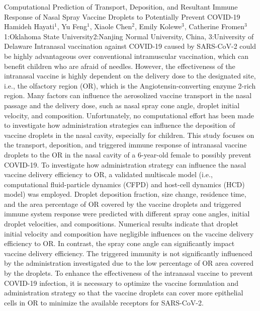 \begin{addmargin}[2em]{0em}
\vspace{1.5ex}
\abs
{Computational Prediction of Transport, Deposition, and Resultant Immune Response of Nasal Spray Vaccine Droplets to Potentially Prevent COVID-19}
{Hamideh Hayati$^1$, Yu Feng$^1$, Xiaole Chen$^2$, Emily Kolewe$^3$, Catherine Fromen$^3$}
{1:Oklahoma State University2:Nanjing Normal University, China, 3:University of Delaware}
{Intranasal vaccination against COVID-19 caused by SARS-CoV-2 could be highly advantageous over conventional intramuscular vaccination, which can benefit children who are afraid of needles. However, the effectiveness of the intranasal vaccine is highly dependent on the delivery dose to the designated site, i.e., the olfactory region (OR), which is the Angiotensin-converting enzyme 2-rich region. Many factors can influence the aerosolized vaccine transport in the nasal passage and the delivery dose, such as nasal spray cone angle, droplet initial velocity, and composition. Unfortunately, no computational effort has been made to investigate how administration strategies can influence the deposition of vaccine droplets in the nasal cavity, especially for children. This study focuses on the transport, deposition, and triggered immune response of intranasal vaccine droplets to the OR in the nasal cavity of a 6-year-old female to possibly prevent COVID-19. To investigate how administration strategy can influence the nasal vaccine delivery efficiency to OR, a validated multiscale model (i.e., computational fluid-particle dynamics (CFPD) and host-cell dynamics (HCD) model) was employed. Droplet deposition fraction, size change, residence time, and the area percentage of OR covered by the vaccine droplets and triggered immune system response were predicted with different spray cone angles, initial droplet velocities, and compositions. Numerical results indicate that droplet initial velocity and composition have negligible influences on the vaccine delivery efficiency to OR. In contrast, the spray cone angle can significantly impact vaccine delivery efficiency. The triggered immunity is not significantly influenced by the administration investigated due to the low percentage of OR area covered by the droplets. To enhance the effectiveness of the intranasal vaccine to prevent COVID-19 infection, it is necessary to optimize the vaccine formulation and administration strategy so that the vaccine droplets can cover more epithelial cells in OR to minimize the available receptors for SARS-CoV-2.}



\end{addmargin}
